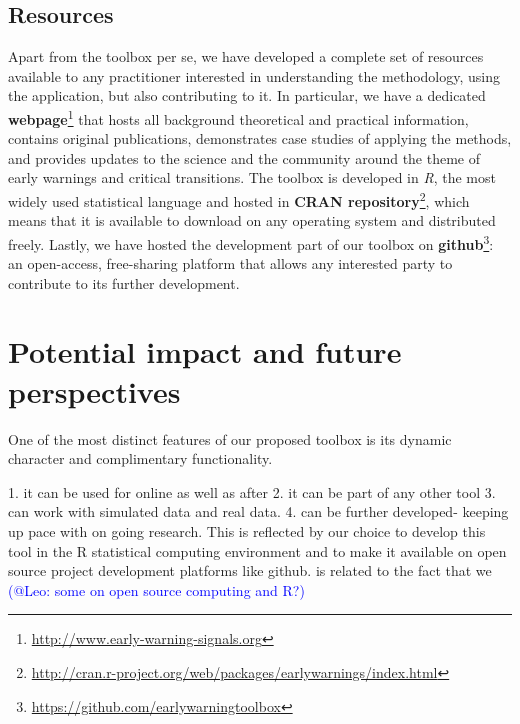 \documentclass[12pt,a4paper,final]{article}
\begin{document}
\subsection{Resources} 
\label{sec:resources}
Apart from the toolbox per se, we have developed a complete set of resources available to any practitioner interested in understanding the methodology, using the application, but also contributing to it. In particular, we have a dedicated  \textbf{webpage}\footnote{\url{http://www.early-warning-signals.org}} that hosts all background theoretical and practical information, contains original publications, demonstrates case studies of applying the methods, and provides updates to the science and the community around the theme of early warnings and critical transitions. The toolbox is developed in \textit{R}, the most widely used statistical language and hosted in \textbf{CRAN repository}\footnote{\url{http://cran.r-project.org/web/packages/earlywarnings/index.html}}, which means that it is available to download on any operating system and distributed freely. Lastly, we have hosted the development part of our toolbox on \textbf{github}\footnote{\url{https://github.com/earlywarningtoolbox}}: an open-access, free-sharing platform that allows any interested party to contribute to its further development.


\section{Potential impact and future perspectives}
One of the most distinct features of our proposed toolbox is its dynamic character and complimentary functionality.

1. it can be used for online as well as after 
2. it can be part of any other tool
3. can work with simulated data and real data.
4. can be further developed- keeping up pace with on going research. This is reflected by our choice to develop this tool in the R statistical computing environment and to make it available on open source project development platforms like github. is related to the fact that we 
\textcolor{blue}{(@Leo: some on open source computing and R?)}
\end{document}
